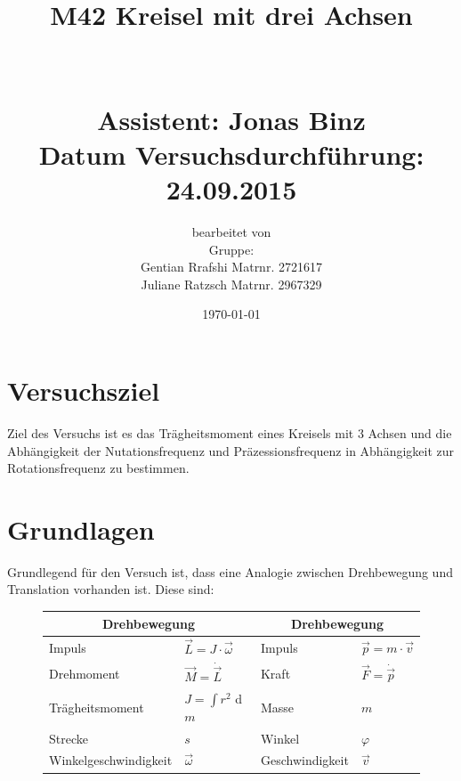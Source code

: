 \documentclass[fontsize=12pt]{scrartcl}
\begin{document}
\begin{minipage}{0.9\textwidth}
\begin{center}\large
\title{ M42 Kreisel mit drei Achsen \\
		~\\
		~\\
		Assistent: Jonas Binz\\
		Datum Versuchsdurchführung: \\
		24.09.2015}

\author{bearbeitet von\\
		Gruppe: \\
		Gentian Rrafshi Matrnr. 2721617 \\
		Juliane Ratzsch Matrnr. 2967329}
\date{\today}

\maketitle

\end{center}
\end{minipage}

\newpage

\tableofcontents

\newpage
\noindent

\section{ Versuchsziel}

Ziel des Versuchs ist es das Trägheitsmoment eines Kreisels mit 3 Achsen und die Abhängigkeit der Nutationsfrequenz und Präzessionsfrequenz in Abhängigkeit zur Rotationsfrequenz zu bestimmen.

\section{ Grundlagen}

Grundlegend für den Versuch ist, dass eine Analogie zwischen Drehbewegung und Translation vorhanden ist. Diese sind:

\begin{figure}[H]
\centering
\begin{tabular}{|l l|l l|} \hline
 \multicolumn{2}{|c|}{Drehbewegung} &  \multicolumn{2}{c|}{Drehbewegung}\\ \hline
 Impuls &$ \vec{L} = J\cdot \vec{\omega}$ & Impuls & $\vec{p} = m \cdot \vec{v}$  \\
Drehmoment& $\vec{M}=\dot{\vec{L}}$ & Kraft & $\vec{F}=\dot{\vec{p}}$  \\
 Trägheitsmoment& $J = \int r^2$ d$m$& Masse & $m$  \\
 Strecke& $s$ & Winkel & $\varphi$  \\
 Winkelgeschwindigkeit& $\vec{\omega}$ & Geschwindigkeit & $\vec{v} $ \\ \hline
\end{tabular}
\end{figure} \par
\end{document}
